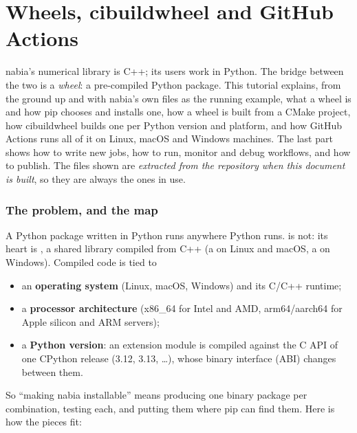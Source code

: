 \chapter{Wheels, cibuildwheel and GitHub Actions}\label{ch:packaging}

nabia's numerical library is C++; its users work in Python. The bridge between the two is a
\emph{wheel}: a pre-compiled Python package. This tutorial explains, from the ground up and with
nabia's own files as the running example, what a wheel is and how pip chooses and installs one,
how a wheel is built from a CMake project, how cibuildwheel builds one per Python version and
platform, and how GitHub Actions runs all of it on Linux, macOS and Windows machines. The last
part shows how to write new jobs, how to run, monitor and debug workflows, and how to publish.
The files shown are \emph{extracted from the repository when this document is built}, so they
are always the ones in use.





\subsection{The problem, and the map}

A Python package written in Python runs anywhere Python runs.  is not:
its heart is , a shared library compiled from C++ (a  on Linux and macOS,
a  on Windows). Compiled code is tied to
\begin{itemize}
  \item an \textbf{operating system} (Linux, macOS, Windows) and its C/C++ runtime;
  \item a \textbf{processor architecture} (x86\_64 for Intel and AMD, arm64/aarch64 for Apple
        silicon and ARM servers);
  \item a \textbf{Python version}: an extension module is compiled against the C API of one
        CPython release (3.12, 3.13, \dots), whose binary interface (ABI) changes between them.
\end{itemize}
So ``making nabia installable'' means producing one binary package per combination, testing each,
and putting them where pip can find them. Here is how the pieces fit:

